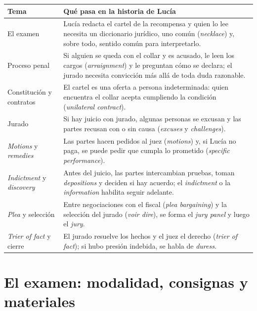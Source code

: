 \documentclass[12pt,oneside]{book}
\begin{document}
\begin{table}[H]
\centering
\begin{tabularx}{\textwidth}{P{3.6cm}L}
\toprule
\textbf{Tema} & \textbf{Qué pasa en la historia de Lucía} \\
\midrule
El examen &
Lucía redacta el cartel de la recompensa y quien lo lee necesita un diccionario jurídico, uno común (\textit{necklace}) y, sobre todo, sentido común para interpretarlo. \\
Proceso penal &
Si alguien se queda con el collar y es acusado, le leen los cargos (\textit{arraignment}) y le preguntan cómo se declara; el jurado necesita convicción más allá de toda duda razonable. \\
Constitución y contratos &
El cartel es una oferta a persona indeterminada: quien encuentra el collar acepta cumpliendo la condición (\textit{unilateral contract}). \\
Jurado &
Si hay juicio con jurado, algunas personas se excusan y las partes recusan con o sin causa (\textit{excuses} y \textit{challenges}). \\
\textit{Motions} y \textit{remedies} &
Las partes hacen pedidos al juez (\textit{motions}) y, si Lucía no paga, se puede pedir que cumpla lo prometido (\textit{specific performance}). \\
\textit{Indictment} y \textit{discovery} &
Antes del juicio, las partes intercambian pruebas, toman \textit{depositions} y deciden si hay acuerdo; el \textit{indictment} o la \textit{information} habilita seguir adelante. \\
\textit{Plea} y selección &
Entre negociaciones con el fiscal (\textit{plea bargaining}) y la selección del jurado (\textit{voir dire}), se forma el \textit{jury panel} y luego el \textit{jury}. \\
\textit{Trier of fact} y cierre &
El jurado resuelve los hechos y el juez el derecho (\textit{trier of fact}); si hubo presión indebida, se habla de \textit{duress}. \\
\bottomrule
\end{tabularx}
\end{table}

\mainmatter

\chapter[El examen]{El examen: modalidad, consignas y materiales}
\end{document}
